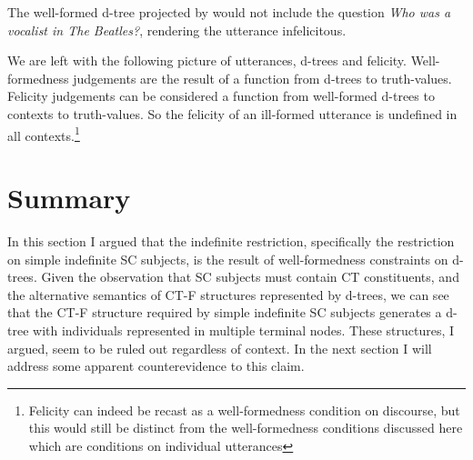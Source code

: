 \documentclass[GPFinal]{subfiles}
\begin{document}
The well-formed d-tree projected by \LLast[b] would not include the question \textit{Who was a vocalist in The Beatles?}, rendering the utterance infelicitous.

We are left with the following picture of utterances, d-trees and felicity.
Well-formedness judgements are the result of a function from d-trees to truth-values.
Felicity judgements can be considered a function from well-formed d-trees to contexts to truth-values.
So the felicity of an ill-formed utterance is undefined in all contexts.\footnote{
  Felicity can indeed be recast as a well-formedness condition on discourse, but this would still be distinct from the well-formedness conditions discussed here which are conditions on individual utterances  
}

\section{Summary}
In this section I argued that the indefinite restriction, specifically the restriction on simple indefinite SC subjects, is the result of well-formedness constraints on d-trees.
Given the observation that SC subjects must contain CT constituents, and the alternative semantics of CT-F structures represented by  d-trees, we can see that the CT-F structure required by simple indefinite SC subjects generates a d-tree with individuals represented in multiple terminal nodes.
These structures, I argued, seem to be ruled out regardless of context.
In the next section I will address some apparent counterevidence to this claim.
\end{document}
